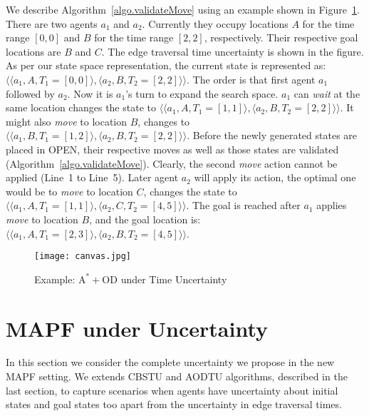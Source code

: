 \documentclass{article}
\begin{document}
We describe Algorithm~\ref{algo.validateMove} using an example shown in Figure~\ref{fig-aodtu}. There are two agents $a_1$ and $a_2$. Currently they occupy locations $A$ for the time range $[0,0]$ and $B$ for the time range $[2,2]$, respectively. 
Their respective goal locations are $B$ and $C$. The edge traversal time uncertainty is shown in the figure. As per our state space representation, the current state is represented as: 
$\langle \langle a_1, A, T_1 = [0,0]\rangle, \langle a_2, B, T_2 = [2,2]\rangle \rangle$. The order is that first agent $a_1$ followed by $a_2$. 
Now it is $a_1$'s turn to expand the search space. $a_1$ can \emph{wait} at the same location changes the state to $\langle \langle a_1, A, T_1 = [1,1]\rangle, \langle a_2, B, T_2 = [2,2]\rangle \rangle$. It might also \emph{move} to location $B$, changes to $\langle \langle a_1, B, T_1 = [1,2]\rangle, \langle a_2, B, T_2 = [2,2]\rangle \rangle$. 
Before the newly generated states are placed in OPEN, their respective moves as well as those states are validated (Algorithm~\ref{algo.validateMove}). 
Clearly, the second \emph{move} action cannot be applied (Line~1 to Line~5). Later agent $a_2$ will apply its action, the optimal one would be to \emph{move} to location $C$, changes the state to $\langle \langle a_1, A, T_1 = [1,1]\rangle, \langle a_2, C, T_2 = [4,5]\rangle \rangle$. 
The goal is reached after $a_1$ applies  \emph{move} to location $B$, and the goal location is: $\langle \langle a_1, A, T_1 = [2,3]\rangle, \langle a_2, B, T_2 = [4,5]\rangle \rangle$. 

\begin{figure} 
    \centering
    \texttt{[image: canvas.jpg]}
    \caption{Example: $\mathrm{A^*+OD}$ under Time Uncertainty}
    \label{fig-aodtu}
\end{figure}

\section{MAPF under Uncertainty}
In this section we consider the complete uncertainty we propose in the new MAPF setting. 
We extends CBSTU and AODTU algorithms, described in the last section, to capture scenarios when agents have uncertainty about initial states and goal states too apart from the uncertainty in edge traversal times.  
\end{document}
